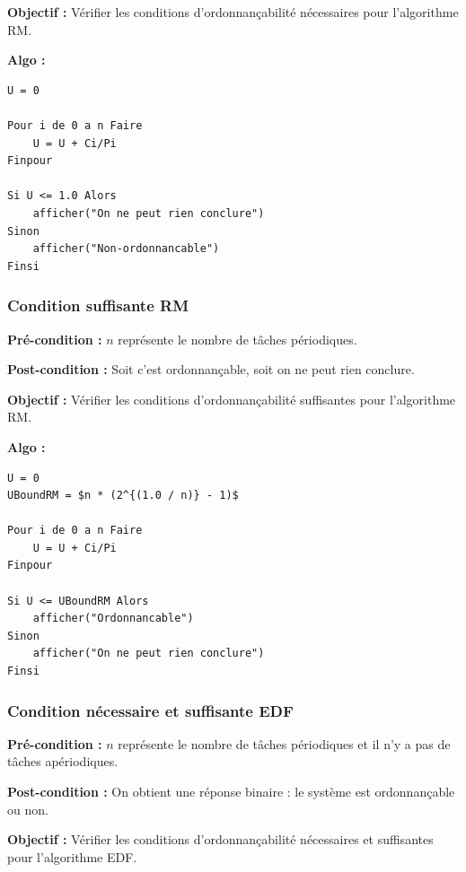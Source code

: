 				\textbf{Objectif :} Vérifier les conditions d'ordonnançabilité nécessaires pour l'algorithme RM.
				
				\textbf{Algo :} 
					\begin{lstlisting}
U = 0

Pour i de 0 a n Faire
	U = U + Ci/Pi
Finpour		

Si U <= 1.0 Alors
	afficher("On ne peut rien conclure")
Sinon
	afficher("Non-ordonnancable")
Finsi
					\end{lstlisting}
			
			\subsubsection{Condition suffisante RM}
				\textbf{Pré-condition :} $n$ représente le nombre de tâches périodiques.
				
				\textbf{Post-condition :} Soit c'est ordonnançable, soit on ne peut rien conclure.
				
				\textbf{Objectif :} Vérifier les conditions d'ordonnançabilité suffisantes pour l'algorithme RM.
				
				\textbf{Algo :} 
					\begin{lstlisting}[mathescape]
U = 0
UBoundRM = $n * (2^{(1.0 / n)} - 1)$
					
Pour i de 0 a n Faire
	U = U + Ci/Pi
Finpour

Si U <= UBoundRM Alors
	afficher("Ordonnancable")
Sinon
	afficher("On ne peut rien conclure")
Finsi
					\end{lstlisting}
			
			\subsubsection{Condition nécessaire et suffisante EDF}
				\textbf{Pré-condition :} $n$ représente le nombre de tâches périodiques et il n'y a pas de tâches apériodiques.
				
				\textbf{Post-condition :} On obtient une réponse binaire : le système est ordonnançable ou non.
				
				\textbf{Objectif :} Vérifier les conditions d'ordonnançabilité nécessaires et suffisantes pour l'algorithme EDF.
				
